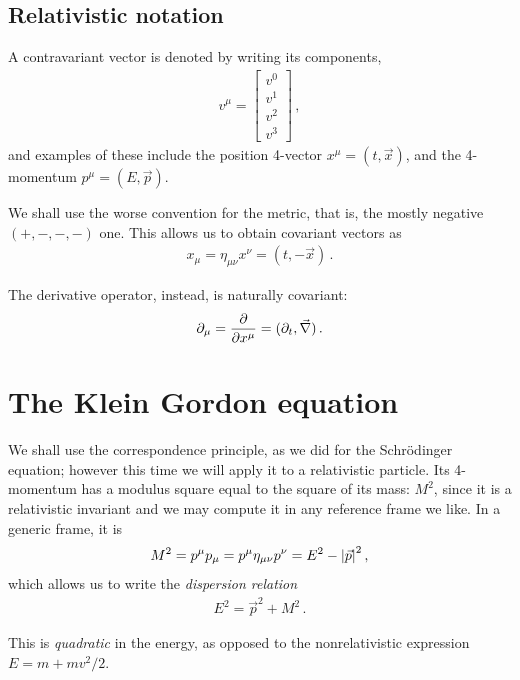 \documentclass[main.tex]{subfiles}
\begin{document}
\subsection{Relativistic notation}

A contravariant vector is denoted by writing its components, 
%
\begin{align}
v^{\mu } = \left[\begin{array}{c}
v^{0} \\ 
v^{1} \\ 
v^{2} \\ 
v^{3}
\end{array}\right]
\,,
\end{align}
%
and examples of these include the position 4-vector \(x^{\mu } = (t, \vec{x})\), and the 4-momentum \(p^{\mu } = (E, \vec{p})\). 

We shall use the worse convention for the metric, that is, the mostly negative \((+,-,-,-)\) one. 
This allows us to obtain covariant vectors as 
%
\begin{align}
x_{\mu } = \eta_{\mu \nu } x^{\nu } = (t,-\vec{x})
\,.
\end{align}

The derivative operator, instead, is naturally covariant: 
%
\begin{align}
\partial_{\mu } = \pdv{}{x^{\mu }} = (\partial_{t}, \vec{\nabla})
\,.
\end{align}

\section{The Klein Gordon equation}

We shall use the correspondence principle, as we did for the Schrödinger equation; however this time we will apply it to a relativistic particle. Its 4-momentum has a modulus square equal to the square of its mass: \(M^2\), since it is a relativistic invariant and we may compute it in any reference frame we like. 
In a generic frame, it is
%
\begin{align}
M^2 = p^{\mu } p_{\mu } =  p^{\mu } \eta_{\mu \nu } p^{\nu } = E^2 - \abs{\vec{p}}^2
\,,
\end{align}
%
which allows us to write the \emph{dispersion relation} 
%
\begin{align}
E^2 = \vec{p}^2 + M^2
\,.
\end{align}

This is \emph{quadratic} in the energy, as opposed to the nonrelativistic expression \(E = m + mv^2 /2\). 
\end{document}
